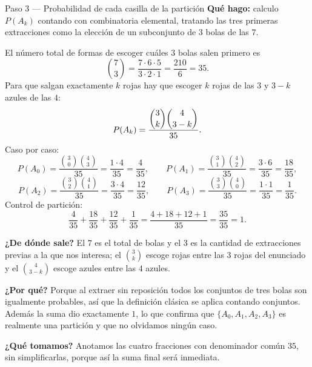 \documentclass[11pt]{article}
\begin{document}
\begin{paso}{Paso 3 --- Probabilidad de cada casilla de la partición}
\textbf{Qué hago:} calculo $P(A_k)$ contando con combinatoria elemental, tratando las tres primeras extracciones como la elección de un subconjunto de $3$ bolas de las $7$.

El número total de formas de escoger cuáles $3$ bolas salen primero es
\[
\binom{7}{3}=\frac{7\cdot 6\cdot 5}{3\cdot 2\cdot 1}=\frac{210}{6}=35 .
\]
Para que salgan exactamente $k$ rojas hay que escoger $k$ rojas de las $3$ y $3-k$ azules de las $4$:
\[
P(A_k)=\frac{\dbinom{3}{k}\dbinom{4}{3-k}}{35}.
\]
Caso por caso:
\[
P(A_0)=\frac{\binom{3}{0}\binom{4}{3}}{35}=\frac{1\cdot 4}{35}=\frac{4}{35},
\qquad
P(A_1)=\frac{\binom{3}{1}\binom{4}{2}}{35}=\frac{3\cdot 6}{35}=\frac{18}{35},
\]
\[
P(A_2)=\frac{\binom{3}{2}\binom{4}{1}}{35}=\frac{3\cdot 4}{35}=\frac{12}{35},
\qquad
P(A_3)=\frac{\binom{3}{3}\binom{4}{0}}{35}=\frac{1\cdot 1}{35}=\frac{1}{35}.
\]
Control de partición:
\[
\frac{4}{35}+\frac{18}{35}+\frac{12}{35}+\frac{1}{35}=\frac{4+18+12+1}{35}=\frac{35}{35}=1 .
\]

\textbf{¿De dónde sale?} El $7$ es el total de bolas y el $3$ es la cantidad de extracciones previas a la que nos interesa; el $\binom{3}{k}$ escoge rojas entre las $3$ rojas del enunciado y el $\binom{4}{3-k}$ escoge azules entre las $4$ azules.

\textbf{¿Por qué?} Porque al extraer sin reposición todos los conjuntos de tres bolas son igualmente probables, así que la definición clásica se aplica contando conjuntos. Además la suma dio exactamente $1$, lo que confirma que $\{A_0,A_1,A_2,A_3\}$ es realmente una partición y que no olvidamos ningún caso.

\textbf{¿Qué tomamos?} Anotamos las cuatro fracciones con denominador común $35$, sin simplificarlas, porque así la suma final será inmediata.
\end{paso}
\end{document}
